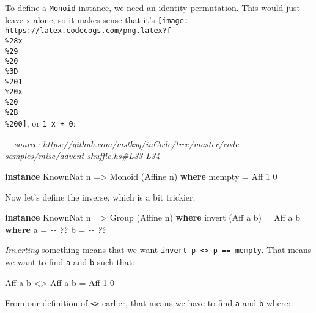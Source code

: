 \documentclass[]{article}
\newenvironment{Shaded}{}{}
\newcommand{\CommentTok}[1]{\textcolor[rgb]{0.38,0.63,0.69}{\textit{#1}}}
\newcommand{\DataTypeTok}[1]{\textcolor[rgb]{0.56,0.13,0.00}{#1}}
\newcommand{\DecValTok}[1]{\textcolor[rgb]{0.25,0.63,0.44}{#1}}
\newcommand{\FunctionTok}[1]{\textcolor[rgb]{0.02,0.16,0.49}{#1}}
\newcommand{\KeywordTok}[1]{\textcolor[rgb]{0.00,0.44,0.13}{\textbf{#1}}}
\newcommand{\NormalTok}[1]{#1}
\newcommand{\OperatorTok}[1]{\textcolor[rgb]{0.40,0.40,0.40}{#1}}
\newcommand{\OtherTok}[1]{\textcolor[rgb]{0.00,0.44,0.13}{#1}}
\begin{document}
To define a \texttt{Monoid} instance, we need an identity permutation. This
would just leave x alone, so it makes sense that it's
\texttt{[image: https://latex.codecogs.com/png.latex?f\\\%28x\\\%29\\\%20\\\%3D\\\%201\\\%20x\\\%20\\\%2B\\\%200]},
or \texttt{1\ x\ +\ 0}:

\begin{Shaded}
\begin{Highlighting}[]
\CommentTok{{-}{-} source: https://github.com/mstksg/inCode/tree/master/code{-}samples/misc/advent{-}shuffle.hs\#L33{-}L34}

\KeywordTok{instance} \DataTypeTok{KnownNat}\NormalTok{ n }\OtherTok{=>} \DataTypeTok{Monoid}\NormalTok{ (}\DataTypeTok{Affine}\NormalTok{ n) }\KeywordTok{where}
    \FunctionTok{mempty} \OtherTok{=} \DataTypeTok{Aff} \DecValTok{1} \DecValTok{0}
\end{Highlighting}
\end{Shaded}

Now let's define the inverse, which is a bit trickier.

\begin{Shaded}
\begin{Highlighting}[]
\KeywordTok{instance} \DataTypeTok{KnownNat}\NormalTok{ n }\OtherTok{=>} \DataTypeTok{Group}\NormalTok{ (}\DataTypeTok{Affine}\NormalTok{ n) }\KeywordTok{where}
\NormalTok{    invert (}\DataTypeTok{Aff}\NormalTok{ a b) }\OtherTok{=} \DataTypeTok{Aff}\NormalTok{ a\textquotesingle{} b\textquotesingle{}}
      \KeywordTok{where}
\NormalTok{        a\textquotesingle{} }\OtherTok{=} \CommentTok{{-}{-} ??}
\NormalTok{        b\textquotesingle{} }\OtherTok{=} \CommentTok{{-}{-} ??}
\end{Highlighting}
\end{Shaded}

\emph{Inverting} something means that we want
\texttt{invert\ p\ \textless{}\textgreater{}\ p\ ==\ mempty}. That means we want
to find \texttt{a\textquotesingle{}} and \texttt{b\textquotesingle{}} such that:

\begin{Shaded}
\begin{Highlighting}[]
       \DataTypeTok{Aff}\NormalTok{ a\textquotesingle{} b\textquotesingle{} }\OperatorTok{<>} \DataTypeTok{Aff}\NormalTok{ a b }\OtherTok{=} \DataTypeTok{Aff} \DecValTok{1} \DecValTok{0}
\end{Highlighting}
\end{Shaded}

From our definition of \texttt{\textless{}\textgreater{}} earlier, that means we
have to find \texttt{a\textquotesingle{}} and \texttt{b\textquotesingle{}}
where:
\end{document}
